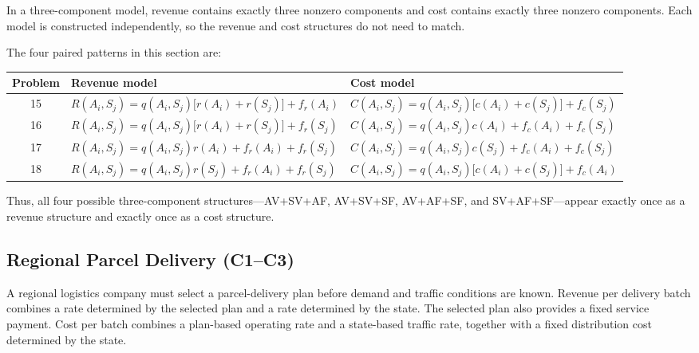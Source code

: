 \vspace{0.8cm}

In a three-component model, revenue contains exactly three nonzero
components and cost contains exactly three nonzero components. Each model
is constructed independently, so the revenue and cost structures do not
need to match.

The four paired patterns in this section are:

\begin{center}
	\small
	\begin{tabular}{cll}
		\toprule
		Problem & Revenue model & Cost model \\
		\midrule
		15
		& \(R(A_i,S_j)
		=q(A_i,S_j)\bigl[r(A_i)+r(S_j)\bigr]
		+f_r(A_i)\)
		& \(C(A_i,S_j)
		=q(A_i,S_j)\bigl[c(A_i)+c(S_j)\bigr]
		+f_c(S_j)\) \\
		
		16
		& \(R(A_i,S_j)
		=q(A_i,S_j)\bigl[r(A_i)+r(S_j)\bigr]
		+f_r(S_j)\)
		& \(C(A_i,S_j)
		=q(A_i,S_j)c(A_i)
		+f_c(A_i)+f_c(S_j)\) \\
		
		17
		& \(R(A_i,S_j)
		=q(A_i,S_j)r(A_i)
		+f_r(A_i)+f_r(S_j)\)
		& \(C(A_i,S_j)
		=q(A_i,S_j)c(S_j)
		+f_c(A_i)+f_c(S_j)\) \\
		
		18
		& \(R(A_i,S_j)
		=q(A_i,S_j)r(S_j)
		+f_r(A_i)+f_r(S_j)\)
		& \(C(A_i,S_j)
		=q(A_i,S_j)\bigl[c(A_i)+c(S_j)\bigr]
		+f_c(A_i)\) \\
		\bottomrule
	\end{tabular}
\end{center}

Thus, all four possible three-component structures---AV+SV+AF,
AV+SV+SF, AV+AF+SF, and SV+AF+SF---appear exactly once as a
revenue structure and exactly once as a cost structure.

\subsection{Regional Parcel Delivery (C1--C3)}
\label{sec:problem15-regional-parcel-delivery-c1-c3}

A regional logistics company must select a parcel-delivery plan before demand
and traffic conditions are known. Revenue per delivery batch combines a rate
determined by the selected plan and a rate determined by the state. The
selected plan also provides a fixed service payment. Cost per batch combines
a plan-based operating rate and a state-based traffic rate, together with a
fixed distribution cost determined by the state.

